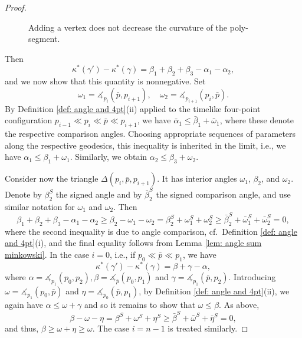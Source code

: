 \documentclass[hidelinks,12pt,a4paper]{article}
\numberwithin{equation}{section}
\theoremstyle{plain}
\theoremstyle{definition}
\newcommand*{\bp}{\bar{p}}
\newcommand{\ma}{\ensuremath{\measuredangle}}
\begin{document}
\begin{proof}
\begin{figure}
\begin{center}
\end{center}
\caption{Adding a vertex does not decrease the curvature of the poly-segment.}
\label{fig: add vertex no curvature}
\end{figure}
Then
\[
\kappa^*(\gamma')-\kappa^*(\gamma)=\beta_1+\beta_2+\beta_3-\alpha_1-\alpha_2,
\]
and we now show that this quantity is nonnegative. Set
\[
\omega_1=\ma_{p_i}(\bar{p},p_{i+1}),\quad \omega_2=\ma_{p_{i+1}}(p_i,\bar{p}).
\]
By Definition \ref{def: angle and 4pt}(ii) applied to the timelike four-point configuration $p_{i-1} \ll p_i \ll \bp \ll p_{i+1}$, we have $\bar\alpha_1 \leq \bar\beta_1 + \bar\omega_1$, where these denote the respective comparison angles. 
Choosing appropriate sequences of parameters along the respective geodesics, this inequality is inherited in the limit, i.e., we have $\alpha_1\le \beta_1+\omega_1$. 
Similarly, we obtain $\alpha_2\le \beta_3+\omega_2$. 

Consider now the triangle $\Delta(p_i,\bar{p},p_{i+1})$. 
It has interior angles $\omega_1$, $\beta_2$, and $\omega_2$. Denote by $\beta_2^S$ the signed angle and by $\bar\beta_2^S$ the signed comparison angle, and use similar notation for $\omega_1$ and $\omega_2$. 
Then
\begin{equation*}
\label{eq:SumOfAnglesVertex}
\beta_1+\beta_2+\beta_3-\alpha_1-\alpha_2 \ge \beta_2-\omega_1-\omega_2 = \beta_2^S+\omega_1^S+\omega_2^S \ge \bar\beta_2^S+\bar\omega_1^S+\bar\omega_2^S = 0,
\end{equation*}
where the second inequality is due to angle comparison, cf.\ Definition \ref{def: angle and 4pt}(i), and the final equality follows from Lemma \ref{lem: angle sum minkowski}.
In the case $i=0$, i.e., if $p_0 \ll \bar{p} \ll p_1$, we have
\begin{equation*}
\kappa^*(\gamma')-\kappa^*(\gamma)= \beta + \gamma - \alpha,
\end{equation*}
where $\alpha = \ma_{p_1}(p_0,p_2), \beta = \ma_{\bar{p}}(p_0,p_1)$ and $\gamma = \ma_{p_1}(\bar{p},p_2)$. 
Introducing $\omega = \ma_{p_1}(p_0,\bar{p})$ and $\eta = \ma_{p_0}(\bar{p},p_1)$, by Definition \ref{def: angle and 4pt}(ii), we again have $\alpha \leq \omega + \gamma$ and so it remains to show that $\omega \leq \beta$. 
As above,
\begin{equation*}
\beta - \omega - \eta = \beta^S + \omega^S + \eta^S \geq \bar\beta^S + \bar\omega^S + \bar\eta^S = 0,
\end{equation*}
and thus, $\beta \geq \omega + \eta \geq \omega$. 
The case $i = n-1$ is treated similarly.
\end{proof}
\end{document}
